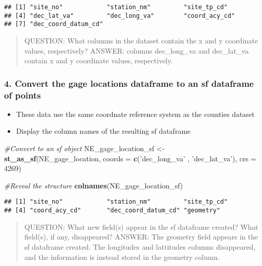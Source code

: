 \documentclass[]{article}
\newenvironment{Shaded}{\begin{snugshade}}{\end{snugshade}}
\newcommand{\KeywordTok}[1]{\textcolor[rgb]{0.13,0.29,0.53}{\textbf{#1}}}
\newcommand{\DataTypeTok}[1]{\textcolor[rgb]{0.13,0.29,0.53}{#1}}
\newcommand{\DecValTok}[1]{\textcolor[rgb]{0.00,0.00,0.81}{#1}}
\newcommand{\StringTok}[1]{\textcolor[rgb]{0.31,0.60,0.02}{#1}}
\newcommand{\CommentTok}[1]{\textcolor[rgb]{0.56,0.35,0.01}{\textit{#1}}}
\newcommand{\NormalTok}[1]{#1}
\providecommand{\tightlist}{%
  \setlength{\itemsep}{0pt}\setlength{\parskip}{0pt}}
\begin{document}
\begin{verbatim}
## [1] "site_no"            "station_nm"         "site_tp_cd"        
## [4] "dec_lat_va"         "dec_long_va"        "coord_acy_cd"      
## [7] "dec_coord_datum_cd"
\end{verbatim}

\begin{quote}
QUESTION: What columns in the dataset contain the x and y coordinate
values, respectively? ANSWER: columns dec\_long\_va and dec\_lat\_va
contain x and y coordinate values, respectively.
\end{quote}

\subsubsection{4. Convert the gage locations dataframe to an sf
dataframe of
points}\label{convert-the-gage-locations-dataframe-to-an-sf-dataframe-of-points}

\begin{itemize}
\tightlist
\item
  These data use the same coordnate reference system as the counties
  dataset
\item
  Display the column names of the resulting sf dataframe
\end{itemize}

\begin{Shaded}
\begin{Highlighting}[]
\CommentTok{#Convert to an sf object}
\NormalTok{NE_gage_location_sf <-}\StringTok{ }\KeywordTok{st_as_sf}\NormalTok{(NE_gage_location, }\DataTypeTok{coords =} \KeywordTok{c}\NormalTok{(}\StringTok{'dec_long_va'}\NormalTok{ , }\StringTok{'dec_lat_va'}\NormalTok{), }\DataTypeTok{crs =} \DecValTok{4269}\NormalTok{)}

\CommentTok{#Reveal the structure}
\KeywordTok{colnames}\NormalTok{(NE_gage_location_sf)}
\end{Highlighting}
\end{Shaded}

\begin{verbatim}
## [1] "site_no"            "station_nm"         "site_tp_cd"        
## [4] "coord_acy_cd"       "dec_coord_datum_cd" "geometry"
\end{verbatim}

\begin{quote}
QUESTION: What new field(s) appear in the sf dataframe created? What
field(s), if any, disappeared? ANSWER: The geometry field appears in the
sf dataframe created. The longitudes and lattitudes columns disappeared,
and the information is instead stored in the geometry column.
\end{quote}
\end{document}
